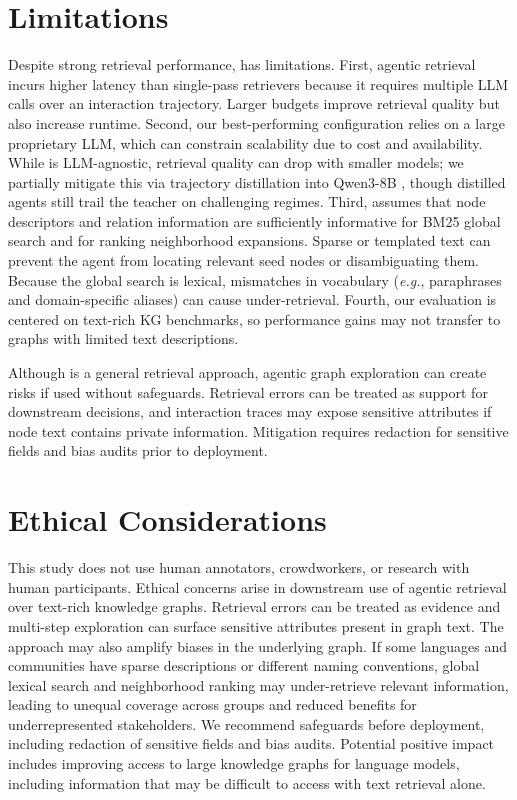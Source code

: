 
\section{Limitations}

Despite strong retrieval performance, \retrieverShort has limitations. First, agentic retrieval incurs higher latency than single-pass retrievers because it requires multiple LLM calls over an interaction trajectory. Larger budgets improve retrieval quality but also increase runtime. Second, our best-performing configuration relies on a large proprietary LLM, which can constrain scalability due to cost and availability. While \retrieverShort is LLM-agnostic, retrieval quality can drop with smaller models; we partially mitigate this via trajectory distillation into Qwen3-8B \cite{yang_qwen3_2025}, though distilled agents still trail the teacher on challenging regimes. Third, \retrieverShort assumes that node descriptors and relation information are sufficiently informative for BM25 global search and for ranking neighborhood expansions. Sparse or templated text can prevent the agent from locating relevant seed nodes or disambiguating them. Because the global search is lexical, mismatches in vocabulary (\textit{e.g.}, paraphrases and domain-specific aliases) can cause under-retrieval. Fourth, our evaluation is centered on text-rich KG benchmarks, so performance gains may not transfer to graphs with limited text descriptions. 

Although \retrieverShort is a general retrieval approach, agentic graph exploration can create risks if used without safeguards. Retrieval errors can be treated as support for downstream decisions, and interaction traces may expose sensitive attributes if node text contains private information. Mitigation requires redaction for sensitive fields and bias audits prior to deployment.


\section{Ethical Considerations}

This study does not use human annotators, crowdworkers, or research with human participants. Ethical concerns arise in downstream use of agentic retrieval over text-rich knowledge graphs. Retrieval errors can be treated as evidence and multi-step exploration can surface sensitive attributes present in graph text.
The approach may also amplify biases in the underlying graph. If some languages and communities have sparse descriptions or different naming conventions, global lexical search and neighborhood ranking may under-retrieve relevant information, leading to unequal coverage across groups and reduced benefits for underrepresented stakeholders.
We recommend safeguards before deployment, including redaction of sensitive fields and bias audits.
Potential positive impact includes improving access to large knowledge graphs for language models, including information that may be difficult to access with text retrieval alone.